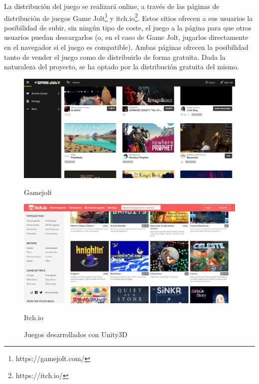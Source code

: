 La distribución del juego se realizará online, a través de las páginas de distribución de juegos Game Jolt\footnote{https://gamejolt.com/} y itch.io\footnote{https://itch.io/}. Estos sitios ofrecen a sus usuarios la posibilidad de subir, sin ningún tipo de coste, el juego a la página para que otros usuarios puedan descargarlos (o, en el caso de Game Jolt, jugarlos directamente en el navegador si el juego es compatible). Ambas páginas ofrecen la posibilidad tanto de vender el juego como de distribuirlo de forma gratuita. Dada la naturaleza del proyecto, se ha optado por la distribución gratuita del mismo.
\begin{figure}[!htb]
   \begin{minipage}{0.50\textwidth}
     \centering
     \includegraphics[width=0.9\linewidth, left]{images/intro/design/gamejolt}
     \caption{Gamejolt}
   \end{minipage}\hfill
   \begin {minipage}{0.50\textwidth}
     \centering
     \includegraphics[width=0.9\linewidth, right]{images/intro/design/itchio}
     \caption{Itch.io}
   \end{minipage}
   \caption{Juegos desarrollados con Unity3D}
\end{figure}
